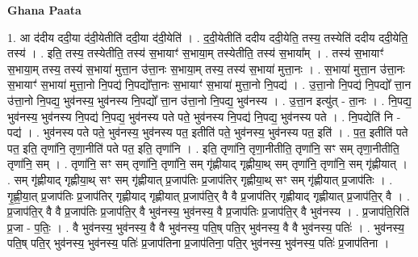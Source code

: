 \documentclass[17pt]{extarticle}
\begin{document}
\textbf{Ghana Paata } \newline

1. आ द॑दीय ददी॒या द॑दी॒येतीति॑ ददी॒या द॑दी॒येति॑ । . द॒दी॒येतीति॑ ददीय ददी॒येति॒ तस्य॒ तस्येति॑ ददीय ददी॒येति॒ तस्य॑ । . इति॒ तस्य॒ तस्येतीति॒ तस्य॑ स॒भायाꣳ॑ स॒भाया॒म् तस्येतीति॒ तस्य॑ स॒भाया᳚म् । . तस्य॑ स॒भायाꣳ॑ स॒भाया॒म् तस्य॒ तस्य॑ स॒भाया॑ मुत्ता॒न उ॑त्ता॒नः स॒भाया॒म् तस्य॒ तस्य॑ स॒भाया॑ मुत्ता॒नः । . स॒भाया॑ मुत्ता॒न उ॑त्ता॒नः स॒भायाꣳ॑ स॒भाया॑ मुत्ता॒नो नि॒पद्य॑ नि॒पद्यो᳚त्ता॒नः स॒भायाꣳ॑ स॒भाया॑ मुत्ता॒नो नि॒पद्य॑ । . उ॒त्ता॒नो नि॒पद्य॑ नि॒पद्यो᳚ त्ता॒न उ॑त्ता॒नो नि॒पद्य॒ भुव॑नस्य॒ भुव॑नस्य नि॒पद्यो᳚ त्ता॒न उ॑त्ता॒नो नि॒पद्य॒ भुव॑नस्य । . उ॒त्ता॒न इत्यु॑त् - ता॒नः । . नि॒पद्य॒ भुव॑नस्य॒ भुव॑नस्य नि॒पद्य॑ नि॒पद्य॒ भुव॑नस्य पते पते॒ भुव॑नस्य नि॒पद्य॑ नि॒पद्य॒ भुव॑नस्य पते । . नि॒पद्येति॑ नि - पद्य॑ । . भुव॑नस्य पते पते॒ भुव॑नस्य॒ भुव॑नस्य पत॒ इतीति॑ पते॒ भुव॑नस्य॒ भुव॑नस्य पत॒ इति॑ । . प॒त॒ इतीति॑ पते पत॒ इति॒ तृणा॑नि॒ तृणा॒नीति॑ पते पत॒ इति॒ तृणा॑नि । . इति॒ तृणा॑नि॒ तृणा॒नीतीति॒ तृणा॑नि॒ सꣳ सम् तृणा॒नीतीति॒ तृणा॑नि॒ सम् । . तृणा॑नि॒ सꣳ सम् तृणा॑नि॒ तृणा॑नि॒ सम् गृ॑ह्णीयाद् गृह्णीया॒थ् सम् तृणा॑नि॒ तृणा॑नि॒ सम् गृ॑ह्णीयात् । . सम् गृ॑ह्णीयाद् गृह्णीया॒थ् सꣳ सम् गृ॑ह्णीयात् प्र॒जाप॑तिः प्र॒जाप॑तिर् गृह्णीया॒थ् सꣳ सम् गृ॑ह्णीयात् प्र॒जाप॑तिः । . गृ॒ह्णी॒या॒त् प्र॒जाप॑तिः प्र॒जाप॑तिर् गृह्णीयाद् गृह्णीयात् प्र॒जाप॑ति॒र् वै वै प्र॒जाप॑तिर् गृह्णीयाद् गृह्णीयात् प्र॒जाप॑ति॒र् वै । . प्र॒जाप॑ति॒र् वै वै प्र॒जाप॑तिः प्र॒जाप॑ति॒र् वै भुव॑नस्य॒ भुव॑नस्य॒ वै प्र॒जाप॑तिः प्र॒जाप॑ति॒र् वै भुव॑नस्य । . प्र॒जाप॑ति॒रिति॑ प्र॒जा - प॒तिः॒ । . वै भुव॑नस्य॒ भुव॑नस्य॒ वै वै भुव॑नस्य॒ पति॒ष् पति॒र् भुव॑नस्य॒ वै वै भुव॑नस्य॒ पतिः॑ । . भुव॑नस्य॒ पति॒ष् पति॒र् भुव॑नस्य॒ भुव॑नस्य॒ पतिः॑ प्र॒जाप॑तिना प्र॒जाप॑तिना॒ पति॒र् भुव॑नस्य॒ भुव॑नस्य॒ पतिः॑ प्र॒जाप॑तिना । \newline
\end{document}
